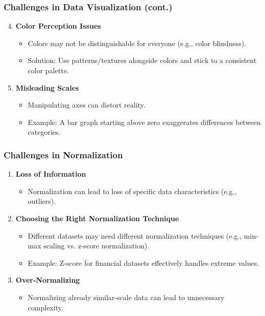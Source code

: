 \documentclass[aspectratio=169]{beamer}
\begin{document}
\begin{frame}[fragile]
    \frametitle{Challenges in Data Visualization (cont.)}
    \begin{enumerate}
        \setcounter{enumi}{3}
        \item \textbf{Color Perception Issues}
            \begin{itemize}
                \item Colors may not be distinguishable for everyone (e.g., color blindness).
                \item Solution: Use patterns/textures alongside colors and stick to a consistent color palette.
            \end{itemize}
        
        \item \textbf{Misleading Scales}
            \begin{itemize}
                \item Manipulating axes can distort reality.
                \item Example: A bar graph starting above zero exaggerates differences between categories.
            \end{itemize}
    \end{enumerate}
\end{frame}

\begin{frame}[fragile]
    \frametitle{Challenges in Normalization}
    \begin{enumerate}
        \item \textbf{Loss of Information}
            \begin{itemize}
                \item Normalization can lead to loss of specific data characteristics (e.g., outliers).
            \end{itemize}

        \item \textbf{Choosing the Right Normalization Technique}
            \begin{itemize}
                \item Different datasets may need different normalization techniques (e.g., min-max scaling vs. z-score normalization).
                \item Example: Z-score for financial datasets effectively handles extreme values.
            \end{itemize}

        \item \textbf{Over-Normalizing}
            \begin{itemize}
                \item Normalizing already similar-scale data can lead to unnecessary complexity.
            \end{itemize}
    \end{enumerate}
\end{frame}
\end{document}
